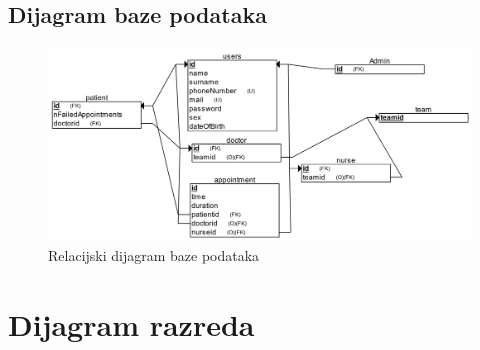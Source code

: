 			\subsection{Dijagram baze podataka}
				\begin{figure}[H]
			            \includegraphics[width=\textwidth]{slike/relacijski.png} %
			            \caption{Relacijski dijagram baze podataka}
			            \label{fig:bp2} %
		            \end{figure}
		            
			
			\eject
			
			
		\section{Dijagram razreda}
		
			
			
			
